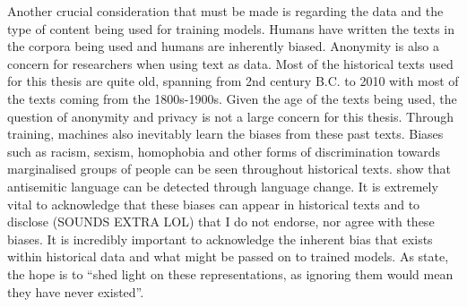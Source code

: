 Another crucial consideration that must be made is regarding the data and the type of content being used for training models. Humans have written the texts in the corpora being used and humans are inherently biased. Anonymity is also a concern for researchers when using text as data. Most of the historical texts used for this thesis are quite old, spanning from 2nd century B.C. to 2010 with most of the texts coming from the 1800s-1900s. Given the age of the texts being used, the question of anonymity and privacy is not a large concern for this thesis. Through training, machines also inevitably learn the biases from these past texts. Biases such as racism, sexism, homophobia and other forms of discrimination towards marginalised groups of people can be seen throughout historical texts. \citet{tripodi-etal-2019-tracing} show that antisemitic language can be detected through language change. It is extremely vital to acknowledge that these biases can appear in historical texts and to disclose (SOUNDS EXTRA LOL) that I do not endorse, nor agree with these biases. It is incredibly important to acknowledge the inherent bias that exists within historical data and what might be passed on to trained models. As \citet{hengchen-tahmasebi_2021-swedishdiachronic} state, the hope is to “shed light on these representations, as ignoring them would mean they have never existed”. 
